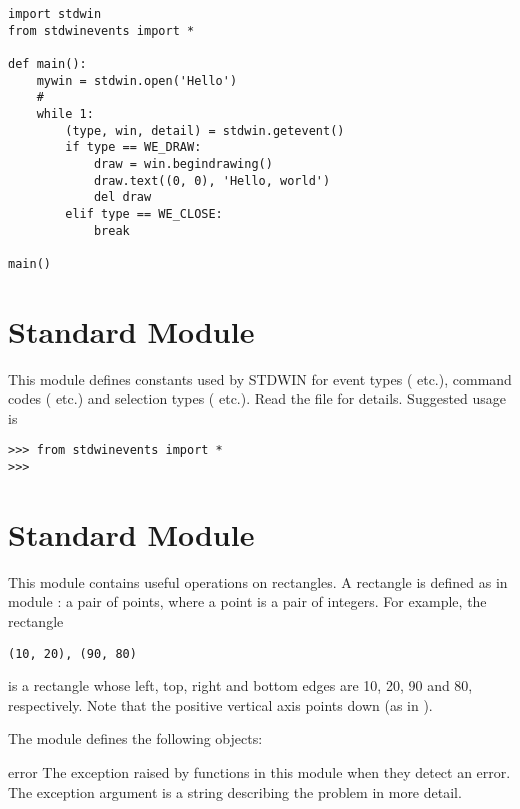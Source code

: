 \bcode\begin{verbatim}
import stdwin
from stdwinevents import *

def main():
    mywin = stdwin.open('Hello')
    #
    while 1:
        (type, win, detail) = stdwin.getevent()
        if type == WE_DRAW:
            draw = win.begindrawing()
            draw.text((0, 0), 'Hello, world')
            del draw
        elif type == WE_CLOSE:
            break

main()
\end{verbatim}\ecode

\section{Standard Module }

This module defines constants used by STDWIN for event types
( etc.), command codes ( etc.)
and selection types ( etc.).
Read the file for details.
Suggested usage is

\bcode\begin{verbatim}
>>> from stdwinevents import *
>>> 
\end{verbatim}\ecode

\section{Standard Module }

This module contains useful operations on rectangles.
A rectangle is defined as in module
:
a pair of points, where a point is a pair of integers.
For example, the rectangle

\bcode\begin{verbatim}
(10, 20), (90, 80)
\end{verbatim}\ecode

is a rectangle whose left, top, right and bottom edges are 10, 20, 90
and 80, respectively.
Note that the positive vertical axis points down (as in
).

The module defines the following objects:

\renewcommand{\indexsubitem}{(in module rect)}
\begin{excdesc}{error}
The exception raised by functions in this module when they detect an
error.
The exception argument is a string describing the problem in more
detail.
\end{excdesc}

